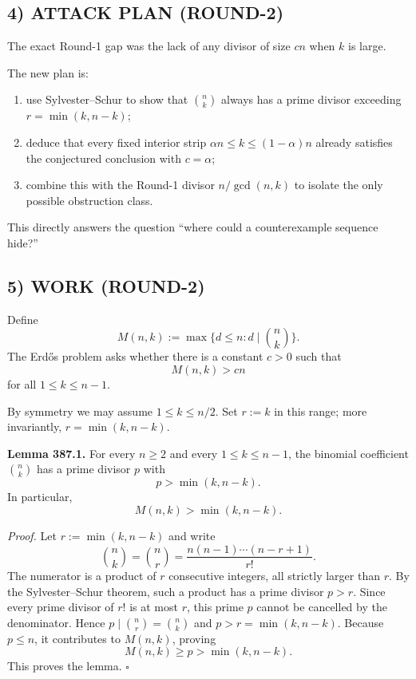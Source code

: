 \subsection*{4) ATTACK PLAN (ROUND-2)}
The exact Round-1 gap was the lack of any divisor of size $cn$ when $k$ is large.

The new plan is:

\begin{enumerate}
\item use Sylvester--Schur to show that $\binom{n}{k}$ always has a prime divisor exceeding $r=\min(k,n-k)$;
\item deduce that every fixed interior strip $\alpha n\leq k\leq (1-\alpha)n$ already satisfies the conjectured conclusion with $c=\alpha$;
\item combine this with the Round-1 divisor $n/\gcd(n,k)$ to isolate the only possible obstruction class.
\end{enumerate}

This directly answers the question ``where could a counterexample sequence hide?''

\subsection*{5) WORK (ROUND-2)}
Define
\[
M(n,k):=\max\{d\leq n: d\mid \binom{n}{k}\}.
\]
The Erd\H{o}s problem asks whether there is a constant $c>0$ such that
\[
M(n,k)>cn
\]
for all $1\leq k\leq n-1$.

By symmetry we may assume $1\leq k\leq n/2$.
Set $r:=k$ in this range; more invariantly, $r=\min(k,n-k)$.

\medskip

\textbf{Lemma 387.1.} For every $n\geq 2$ and every $1\leq k\leq n-1$, the binomial coefficient $\binom{n}{k}$ has a prime divisor $p$ with
\[
p>\min(k,n-k).
\]
In particular,
\[
M(n,k)>\min(k,n-k).
\]

\emph{Proof.} Let $r:=\min(k,n-k)$ and write
\[
\binom{n}{k}=\binom{n}{r}=\frac{n(n-1)\cdots(n-r+1)}{r!}.
\]
The numerator is a product of $r$ consecutive integers, all strictly larger than $r$.
By the Sylvester--Schur theorem, such a product has a prime divisor $p>r$.
Since every prime divisor of $r!$ is at most $r$, this prime $p$ cannot be cancelled by the denominator. Hence $p\mid \binom{n}{r}=\binom{n}{k}$ and $p>r=\min(k,n-k)$.
Because $p\leq n$, it contributes to $M(n,k)$, proving
\[
M(n,k)\geq p>\min(k,n-k).
\]
This proves the lemma. \hfill $\square$

\medskip

